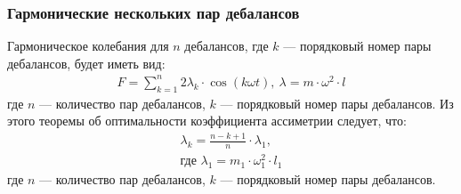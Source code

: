 \documentclass[10pt, pdf, hyperref={unicode}]{beamer}
\begin{document}
    \begin{frame}
        \frametitle{Гармонические нескольких пар дебалансов}
        \begin{center}
            \begin{minipage}[h]{0.97\linewidth}
                Гармоническое колебания для $n$ дебалансов, где $k$ --- порядковый номер пары дебалансов, будет иметь вид:
                \begin{equation}\label{eq:short_harmonic_sum}
                    \begin{gathered}
                        F = \sum\limits_{k = 1}^n 2 \lambda_k \cdot \cos (k \omega t), \ \lambda = m \cdot \omega^2 \cdot l
                    \end{gathered}
                \end{equation}
                \noindent где $n$ --- количество пар дебалансов, $k$ --- порядковый номер пары дебалансов.
                Из этого теоремы об оптимальности коэффициента ассиметрии следует, что:
                \begin{equation}\label{eq:opt_attitude}
                    \begin{gathered}
                        \lambda_k = \frac{n - k + 1}{n} \cdot \lambda_1,\\
                        \textrm{где } \lambda_1 = m_1 \cdot \omega_{1}^{2} \cdot l_1
                    \end{gathered}
                \end{equation}
                \noindent где $n$ --- количество пар дебалансов, $k$ --- порядковый номер пары дебалансов.
            \end{minipage}
        \end{center}
    \end{frame}
\end{document}
